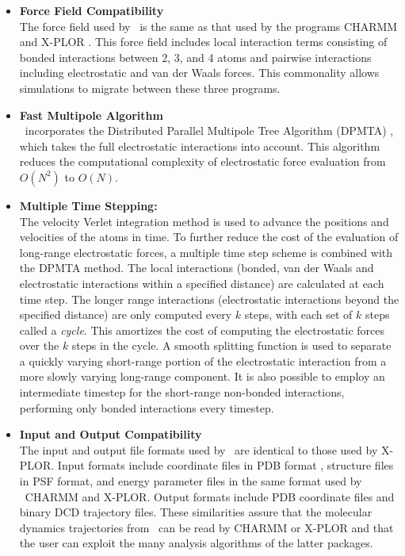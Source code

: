 \begin{itemize}

\item{\bf Force Field Compatibility}\\
The force field used by \NAMD\ is the same as that used by the programs 
CHARMM  and X-PLOR 
.  This force field includes local 
interaction terms consisting of bonded interactions between 2, 3, and 4 atoms 
and pairwise interactions including electrostatic and van der Waals forces.
This commonality allows simulations to migrate between these three programs.

\item{\bf Fast Multipole Algorithm}\\
\NAMD\ incorporates the Distributed Parallel Multipole Tree Algorithm 
(DPMTA) , which takes the full electrostatic
interactions into account.  This algorithm reduces the computational
complexity of electrostatic force evaluation from $O(N^2)$ to $O(N)$.

\item{\bf Multiple Time Stepping:}\\
The velocity Verlet integration method
is used to advance the positions and velocities of the atoms in time.
To further reduce the cost of the evaluation of 
long-range electrostatic forces, 
a multiple time step scheme is combined with the DPMTA method.  The local
interactions (bonded, van der Waals and electrostatic interactions within a
specified distance) are calculated at each time step.  The longer range
interactions (electrostatic interactions beyond the specified distance) are
only computed every $k$ steps, with each set of $k$ steps called a {\em cycle}.
This amortizes the cost of computing the electrostatic forces over the $k$ steps in the cycle.
A smooth splitting function is used to separate a quickly varying short-range portion of the electrostatic interaction from a more slowly varying long-range component.
It is also possible to employ an intermediate timestep for the short-range non-bonded interactions, performing only bonded interactions every timestep.


\item{\bf Input and Output Compatibility}\\
The input and output file formats used by \NAMD\ are identical to those
used by X-PLOR.  Input formats include coordinate files in PDB format
, structure files in PSF format, 
and energy parameter files in the same format used by ~CHARMM and X-PLOR.
Output formats include PDB coordinate files and binary DCD trajectory files.
These similarities assure that the molecular dynamics trajectories from \NAMD\ 
can be read by CHARMM or X-PLOR and that the user can exploit the many 
analysis algorithms of the latter packages.


\end{itemize}
